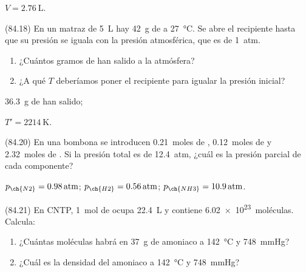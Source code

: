 \documentclass[10pt,a5paper,twoside]{article}
\begin{document}
      \begin{solution}
        \( V = \SI{2.76}{\liter}\).
      \end{solution}




      \begin{exercise}[
          tags    = {},
          topics  = {química,química básica},
          source  = {FQ 1B MGH 2016, p84, e18},
        ]
        (84.18) En un matraz de \SI{5}{\liter} hay \SI{42}{\gram} de  a \SI{27}{\celsius}. Se abre el recipiente hasta que su presión se iguala con la presión atmosférica, que es de \SI{1}{atm}.
        \begin{enumerate}
          \item ¿Cuántos gramos de  han salido a la atmósfera?
          \item ¿A qué \( T \) deberíamos poner el recipiente para igualar la presión inicial?
        \end{enumerate}
      \end{exercise}

      \begin{solution}
        \begin{enumerate*}
          \item \SI{36.3}{\gram} de  han salido;
          \item \( T' = \SI{2214}{\kelvin} \).
        \end{enumerate*}
      \end{solution}




      \begin{exercise}[
          tags    = {},
          topics  = {química,química básica},
          source  = {FQ 1B MGH 2016, p84, e20},
        ]
        (84.20) En una bombona se introducen \SI{0.21}{moles} de , \SI{0.12}{moles}
        de  y \SI{2.32}{moles} de . Si la presión total es de \SI{12.4}{atm}, ¿cuál es la presión parcial de cada componente?
      \end{exercise}

      \begin{solution}
        \( p_{\ch{N2}} = \SI{0.98}{atm} \); \( p_{\ch{H2}} = \SI{0.56}{atm} \); \( p_{\ch{NH3}} = \SI{10.9}{atm} \).
      \end{solution}




      \begin{exercise}[
          tags    = {},
          topics  = {química,química básica},
          source  = {FQ 1B MGH 2016, p84, e21},
        ]
        (84.21) En CNTP, \SI{1}{mol} de  ocupa \SI{22.4}{\liter} y contiene \SI{6.02e23}{moléculas}. Calcula:
        \begin{enumerate}
          \item ¿Cuántas moléculas habrá en \SI{37}{\gram} de amoniaco a \SI{142}{\celsius} y \SI{748}{\mmHg}?
          \item ¿Cuál es la densidad del amoniaco a \SI{142}{\celsius} y \SI{748}{\mmHg}?
        \end{enumerate}
      \end{exercise}
\end{document}
